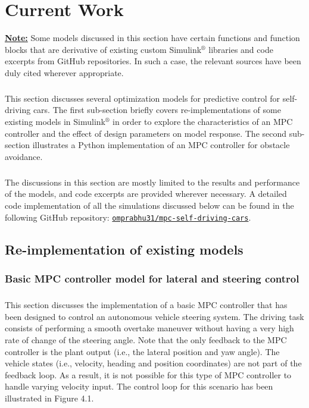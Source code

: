 \chapter{Current Work}
\noindent \underline{\textbf{Note:}} Some models discussed in this section have certain functions and function blocks that are derivative of existing custom Simulink$^{\circledR}$ libraries and code excerpts from GitHub repositories. In such a case, the relevant sources have been duly cited wherever appropriate.

\paragraph{}
This section discusses several optimization models for predictive control for self-driving cars. The first sub-section briefly covers re-implementations of some existing models in Simulink$^{\circledR}$ in order to explore the characteristics of an MPC controller and the effect of design parameters on model response. The second sub-section illustrates a Python implementation of an MPC controller for obstacle avoidance.

\paragraph{}
The discussions in this section are mostly limited to the results and performance of the models, and code excerpts are provided wherever necessary. A detailed code implementation of all the simulations discussed below can be found in the following GitHub repository: \href{https://github.com/omprabhu31/mpc_self_driving_cars}{\texttt{omprabhu31/mpc-self-driving-cars}}.

\section{Re-implementation of existing models}

\subsection{Basic MPC controller model for lateral and steering control}
\paragraph{}
This section discusses the implementation of a basic MPC controller that has been designed to control an autonomous vehicle steering system. The driving task consists of performing a smooth overtake maneuver without having a very high rate of change of the steering angle. Note that the only feedback to the MPC controller is the plant output (i.e., the lateral position and yaw angle). The vehicle states (i.e., velocity, heading and position coordinates) are not part of the feedback loop. As a result, it is not possible for this type of MPC controller to handle varying velocity input. The control loop for this scenario has been illustrated in Figure 4.1.

